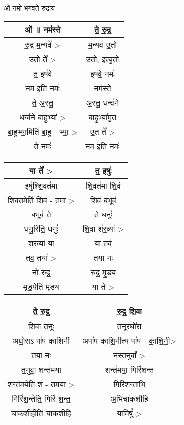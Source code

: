 \subsection{}
ओं नमो भगवते रुद्राय
{\centering
\begin{longtable}{|c|c|}
\hline
ओं ॥  नम॑स्ते                & ते॒ रु॒द्र॒\\
\hline
रु॒द्र॒ म॒न्यवे᳚ >               & म॒न्यव॑ उ॒तो\\
\hline
उ॒तो ते᳚ >                  & उ॒तो, इत्यु॒तो\\
\hline
त॒ इष॑वे                    & इष॑वे॒ नमः॑\\
\hline
नम॒ इति॒ नमः॑               & नम॑स्ते\\
\hline
ते॒ अ॒स्तु॒                    & अ॒स्तु॒ धन्व॑ने\\
\hline
धन्व॑ने बा॒हुभ्यां᳚ >            & बा॒हुभ्या॑मु॒त\\
\hline
बा॒हुभ्या॒मिति॑ बा॒हु - भ्यां॒ >   & उ॒त ते᳚ >\\
\hline
ते॒ नमः॑                    & नम॒ इति॒ नमः॑\\
\hline
\end{longtable}
}
{\centering
\begin{longtable}{|c|c|}
\hline
या ते᳚ >                   & त॒ इषुः॑\\
\hline
इषु॑श्शि॒वत॑मा                & शि॒वत॑मा शि॒वं\\
\hline
शि॒वत॒मेति॑ शि॒व - त॒मा॒ >      & शि॒वं ब॒भूव॑\\
\hline
ब॒भूव॑ ते                    & ते॒ धनुः॑\\
\hline
धनु॒रिति॒ धनुः॑               & शि॒वा श॑र॒व्या᳚ >\\
\hline
श॒र॒व्या॑ या                 & या तव॑\\
\hline
तव॒ तया᳚ >                 & तया॑ नः\\
\hline
नो॒ रु॒द्र॒                   & रु॒द्र॒ मृ॒ड॒य॒\\
\hline
मृ॒ड॒येति॑ मृडय                & या ते᳚ >\\
\hline
\end{longtable}
}
{\centering
\begin{longtable}{|c|c|}
\hline
ते॒ रु॒द्र॒                    & रु॒द्र॒ शि॒वा\\
\hline
शि॒वा त॒नूः                 & त॒नूरघो॑रा\\
\hline
अघो॒राऽ पा॑प काशिनी         & अपा॑प काशि॒नीत्य पा॑प - का॒शि॒नी॒>\\
\hline
तया॑ नः                   & न॒स्त॒नुवा᳚ >\\
\hline
त॒नुवा॒ शन्त॑मया              & शन्त॑मया॒ गिरि॑शन्त\\
\hline
शन्त॑म॒येति॒ शं - त॒म॒या॒ >       & गिरि॑शन्ता॒भि\\
\hline
गिरि॑श॒न्तेति॒ गिरि॑-श॒न्त॒       & अ॒भिचा॑कशीहि\\
\hline
चा॒क॒शी॒हीति॑ चाकशीहि        & यामिषुं᳚ >\\
\hline
\end{longtable}
}
